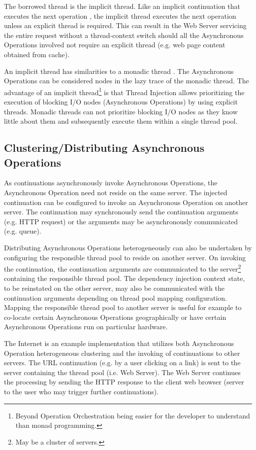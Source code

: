 \documentclass[prodmode]{style/acmlarge}
\begin{document}
The borrowed thread is the implicit thread.  Like an implicit continuation that
executes the next operation \cite{continuations}, the implicit thread executes
the next operation unless an explicit thread is required.  This can result in
the Web Server servicing the entire request without a thread-context switch
should all the Asynchronous Operations involved not require an explicit thread
(e.g. web page content obtained from cache).

An implicit thread has similarities to a monadic thread \cite{monadic-thread}.
The Asynchronous Operations can be considered nodes in the lazy trace of the
monadic thread.  The advantage of an implicit thread\footnote{Beyond Operation
Orchestration being easier for the developer to understand than monad
programming.} is that Thread Injection allows prioritizing the execution of
blocking I/O nodes (Asynchronous Operations) by using explicit threads.  Monadic
threads can not prioritize blocking I/O nodes as they know little about them and
subsequently execute them within a single thread pool.


\subsection{Clustering/Distributing Asynchronous Operations}

As continuations asynchronously invoke Asynchronous Operations, the Asynchronous
Operation need not reside on the same server.  The injected continuation can be
configured to invoke an Asynchronous Operation on another server.  The
continuation may synchronously send the continuation arguments (e.g. HTTP
request) or the arguments may be asynchronously communicated (e.g.
queue).

Distributing Asynchronous Operations heterogeneously can also be undertaken by
configuring the responsible thread pool to reside on another server.  On
invoking the continuation, the continuation arguments are communicated to the
server\footnote{May be a cluster of servers.} containing the responsible thread
pool.  The dependency injection context state, to be reinstated on the other
server, may also be communicated with the continuation arguments depending on
thread pool mapping configuration.  Mapping the responsible thread pool to
another server is useful for example to co-locate certain Asynchronous
Operations geographically or have certain Asynchronous Operations run on
particular hardware.

The Internet is an example implementation that utilizes both Asynchronous
Operation heterogeneous clustering and the invoking of continuations to other
servers.  The URL continuation (e.g. by a user clicking on a link) is sent to
the server containing the thread pool (i.e. Web Server).  The Web Server
continues the processing by sending the HTTP response to the client web browser
(server to the user who may trigger further continuations).
\end{document}
